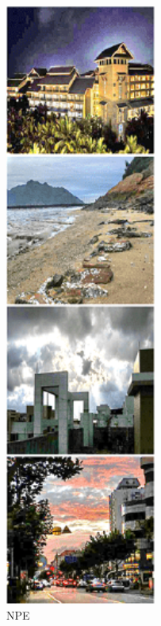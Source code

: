 \documentclass[CJK,aspectratio=169]{beamer}  %
\begin{document}
\begin{frame}
\begin{figure}
\begin{minipage}{.08\paperwidth}
			\label{fig: NPE}	
			\caption*{\tiny NPE}
		\end{minipage}
		\begin{minipage}{.08\paperwidth}
			\centering
			\setlength{\abovecaptionskip}{-0.45cm}
			\includegraphics[width=\linewidth]{picture/LLIE/LightingNet/LIME}

\end{minipage}
\end{figure}
\end{frame}
\end{document}
